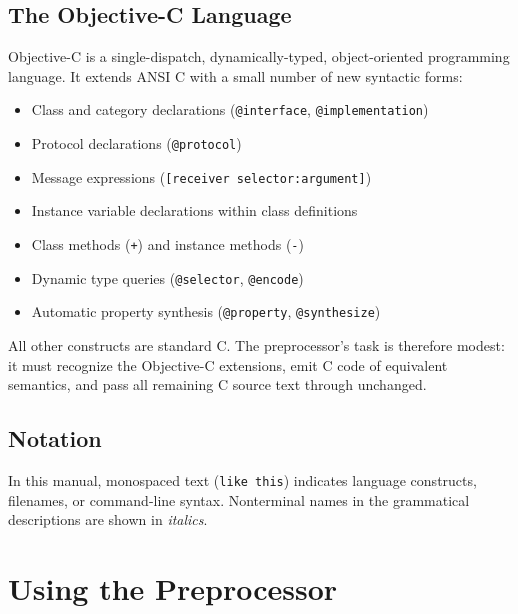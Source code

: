 \documentclass[11pt,twoside]{article}
\begin{document}
\subsection{The Objective-C Language}

Objective-C is a single-dispatch, dynamically-typed, object-oriented
programming language.  It extends ANSI C with a small number of new
syntactic forms:

\begin{itemize}
  \item Class and category declarations ({\tt @interface},
        {\tt @implementation})
  \item Protocol declarations ({\tt @protocol})
  \item Message expressions ({\tt [receiver selector:argument]})
  \item Instance variable declarations within class definitions
  \item Class methods ({\tt +}) and instance methods ({\tt -})
  \item Dynamic type queries ({\tt @selector}, {\tt @encode})
  \item Automatic property synthesis ({\tt @property},
        {\tt @synthesize})
\end{itemize}

All other constructs are standard C.  The preprocessor's task is
therefore modest: it must recognize the Objective-C extensions, emit C
code of equivalent semantics, and pass all remaining C source text
through unchanged.

\subsection{Notation}

In this manual, monospaced text ({\tt like this}) indicates language
constructs, filenames, or command-line syntax.  Nonterminal names in
the grammatical descriptions are shown in {\itshape italics}.

\newpage
\section{Using the Preprocessor}
\end{document}
